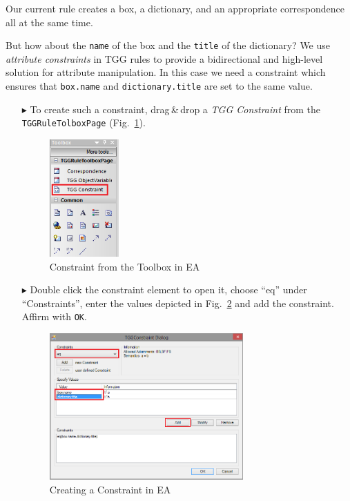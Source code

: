 Our current rule creates a box, a dictionary, and an appropriate correspondence all at the same time.

But how about the \texttt{name} of the box and the \texttt{title} of the dictionary?
We use \emph{attribute constraints} in TGG rules to provide a bidirectional and high-level solution for attribute manipulation.
In this case we need a constraint which ensures that \texttt{box.name} and \texttt{dictionary.title} are set to the same value.

\begin{enumerate}
  \item[$\blacktriangleright$] To create such a constraint, drag\,\&\,drop a \emph{TGG Constraint} from the \texttt{TGGRuleTolboxPage} (Fig.~\ref{fig:common_toolbox}).

  \begin{figure}[htbp]
  \begin{center}
    \includegraphics[width=0.25\textwidth]{pics/tggBilder/tggRule/tgg12}
    \caption{Constraint from the Toolbox in EA}
    \label{fig:common_toolbox}
  \end{center}
  \end{figure}

  \item[$\blacktriangleright$] Double click the constraint element to open it, choose ``eq'' under ``Constraints'', enter the values depicted in
  Fig.~\ref{fig:first_tgg_constraint} and add the constraint.
  Affirm with \texttt{OK}.

  \begin{figure}[htbp]
  \begin{center}
    \includegraphics[width=0.7\textwidth]{pics/tggBilder/tggRule/tgg13.png}
    \caption{Creating a Constraint in EA}
    \label{fig:first_tgg_constraint}
  \end{center}
  \end{figure}


\end{enumerate}
